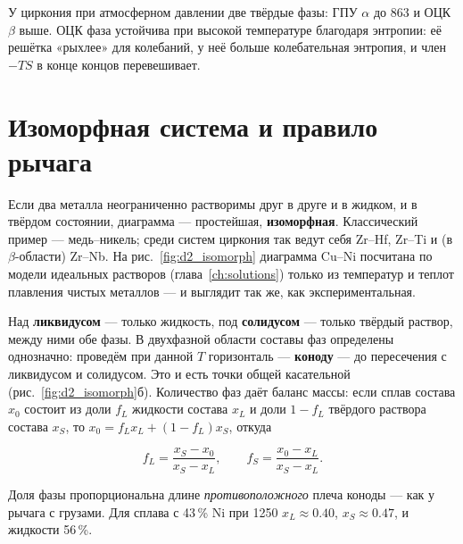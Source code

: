 
У циркония при атмосферном давлении две твёрдые фазы: ГПУ $\alpha$ до 863\degC{} и ОЦК $\beta$ выше. ОЦК фаза
устойчива при высокой температуре благодаря энтропии: её решётка «рыхлее» для колебаний, у неё больше колебательная
энтропия, и член $-TS$ в конце концов перевешивает.

\section{Изоморфная система и правило рычага}

Если два металла неограниченно растворимы друг в друге и в жидком, и в твёрдом состоянии, диаграмма --- простейшая,
\textbf{изоморфная}. Классический пример --- медь--никель; среди систем циркония так ведут себя Zr--Hf, Zr--Ti и
(в $\beta$-области) Zr--Nb. На рис.~\ref{fig:d2_isomorph} диаграмма Cu--Ni посчитана по модели идеальных растворов
(глава~\ref{ch:solutions}) только из температур и теплот плавления чистых металлов --- и выглядит так же, как
экспериментальная.


Над \textbf{ликвидусом} --- только жидкость, под \textbf{солидусом} --- только твёрдый раствор, между ними обе фазы. В
двухфазной области составы фаз определены однозначно: проведём при данной $T$ горизонталь --- \textbf{коноду} --- до
пересечения с ликвидусом и солидусом. Это и есть точки общей касательной (рис.~\ref{fig:d2_isomorph}б). Количество
фаз даёт баланс массы: если сплав состава $x_0$ состоит из доли $f_L$ жидкости состава $x_L$ и доли $1-f_L$ твёрдого
раствора состава $x_S$, то $x_0 = f_Lx_L + (1-f_L)x_S$, откуда
\begin{keyf}
\[
f_L = \frac{x_S - x_0}{x_S - x_L},\qquad f_S = \frac{x_0 - x_L}{x_S - x_L}.
\]
\end{keyf}
Доля фазы пропорциональна длине \emph{противоположного} плеча коноды --- как у рычага с грузами. Для сплава с
43\,\% Ni при 1250\degC{} $x_L\approx0.40$, $x_S\approx0.47$, и жидкости 56\,\%.

